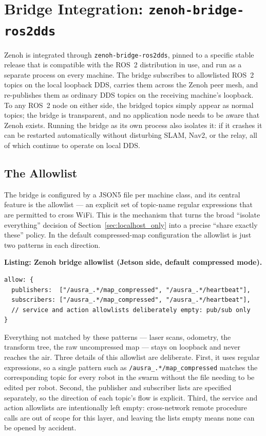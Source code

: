 \section{Bridge Integration: \texttt{zenoh-bridge-ros2dds}}
\label{sec:bridge}

Zenoh is integrated through \texttt{zenoh-bridge-ros2dds}, pinned to a specific stable release that is compatible with the ROS~2 distribution in use, and run as a separate process on every machine. The bridge subscribes to allowlisted ROS~2 topics on the local loopback DDS, carries them across the Zenoh peer mesh, and re-publishes them as ordinary DDS topics on the receiving machine's loopback. To any ROS~2 node on either side, the bridged topics simply appear as normal topics; the bridge is transparent, and no application node needs to be aware that Zenoh exists. Running the bridge as its own process also isolates it: if it crashes it can be restarted automatically without disturbing SLAM, Nav2, or the relay, all of which continue to operate on local DDS.

\subsection{The Allowlist}
\label{subsec:allowlist}

The bridge is configured by a JSON5 file per machine class, and its central feature is the allowlist --- an explicit set of topic-name regular expressions that are permitted to cross WiFi. This is the mechanism that turns the broad ``isolate everything'' decision of Section~\ref{sec:localhost_only} into a precise ``share exactly these'' policy. In the default compressed-map configuration the allowlist is just two patterns in each direction.

\noindent\textbf{Listing: Zenoh bridge allowlist (Jetson side, default compressed mode).}
\begin{lstlisting}
allow: {
  publishers:  ["/ausra_.*/map_compressed", "/ausra_.*/heartbeat"],
  subscribers: ["/ausra_.*/map_compressed", "/ausra_.*/heartbeat"],
  // service and action allowlists deliberately empty: pub/sub only
}
\end{lstlisting}

Everything not matched by these patterns --- laser scans, odometry, the transform tree, the raw uncompressed map --- stays on loopback and never reaches the air. Three details of this allowlist are deliberate. First, it uses regular expressions, so a single pattern such as \texttt{/ausra\_.*/map\_compressed} matches the corresponding topic for every robot in the swarm without the file needing to be edited per robot. Second, the publisher and subscriber lists are specified separately, so the direction of each topic's flow is explicit. Third, the service and action allowlists are intentionally left empty: cross-network remote procedure calls are out of scope for this layer, and leaving the lists empty means none can be opened by accident.

